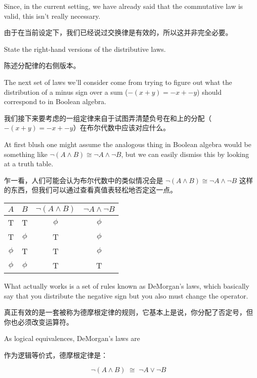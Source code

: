 Since,
in the current setting, we have already said that the commutative
law is valid, this isn't really necessary.

由于在当前设定下，我们已经说过交换律是有效的，所以这并非完全必要。

\begin{exer}
State the right-hand versions of the distributive laws.

陈述分配律的右侧版本。
\end{exer}

The next set of laws we'll consider come from trying to
figure out what the distribution of a minus sign over a sum
($-(x+y) = -x + -y$)
should correspond to in Boolean algebra.

我们接下来要考虑的一组定律来自于试图弄清楚负号在和上的分配（$-(x+y) = -x + -y$）在布尔代数中应该对应什么。

At first blush one 
might assume the analogous thing in Boolean algebra would be
something like ${\lnot}(A \land B) \cong {\lnot}A \land {\lnot}B$,
but we can easily dismiss this by looking at a truth table.

乍一看，人们可能会认为布尔代数中的类似情况会是 ${\lnot}(A \land B) \cong {\lnot}A \land {\lnot}B$ 这样的东西，但我们可以通过查看真值表轻松地否定这一点。

\begin{center}
\begin{tabular}{c|c||c|c}
\; $A$ \; & \; $B$ \; & \; ${\lnot}(A \land B)$ \; & \; ${\lnot}A \land {\lnot}B$\; \\ \hline
T & T &  $\phi$ & $\phi$ \\
T & $\phi$ & T & $\phi$ \\
 $\phi$ & T & T & $\phi$ \\
 $\phi$ &  $\phi$  & T & T\\
\end{tabular}
\end{center}

What actually works is a set of rules known as 
DeMorgan's laws, which
basically say that you distribute the negative sign but
you also must change the operator.

真正有效的是一套被称为德摩根定律的规则，它基本上是说，你分配了否定号，但你也必须改变运算符。

As logical equivalences,
DeMorgan's laws are 

作为逻辑等价式，德摩根定律是：

\[ {\lnot}(A \land B) \; \cong \; {\lnot}A \lor {\lnot}B \]

